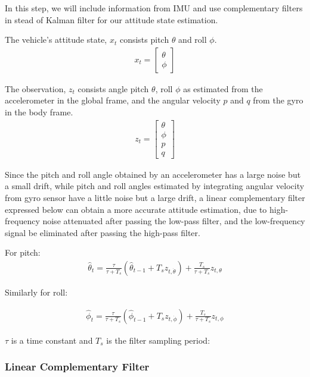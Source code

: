 \documentclass[letterpaper]{article}
\begin{document}
In this step, we will include information from IMU and use complementary filters in stead of Kalman filter for our attitude state estimation.

The vehicle's attitude state, $x_t$ consists pitch $\theta$ and roll $\phi$.
\begin{align*}
  x_t = \left[ \begin{array}{c}\theta\\\phi \end{array} \right]
\end{align*}

The observation, $z_t$ consists angle pitch $\theta$, roll $\phi$ as estimated from the accelerometer in the global frame, and the angular velocity $p$ and $q$ from the gyro in the body frame.
\begin{align*}
  z_t = \left[ \begin{array}{c}\theta\\\phi\\p\\q \end{array} \right]
\end{align*}

Since the pitch and roll angle obtained by an accelerometer has a large noise but a small drift, while pitch and roll angles estimated by integrating angular velocity from gyro sensor have a little noise but a large drift, a linear complementary filter expressed below can obtain a more accurate attitude estimation, due to high-frequency noise attenuated after passing the low-pass filter, and the low-frequency signal be eliminated after passing the high-pass filter.

For pitch: 
\begin{align*}
  \hat{\theta}_t = \frac{\tau}{\tau + T_s} \left( \hat{\theta}_{t-1} + T_s z_{t,\dot{\theta}} \right) + \frac{T_s}{\tau + T_s} z_{t,\theta}
\end{align*}

Similarly for roll: 

\begin{align*}
  \hat{\phi}_t = \frac{\tau}{\tau + T_s} \left( \hat{\phi}_{t-1} + T_s z_{t,\dot{\phi}} \right) + \frac{T_s}{\tau + T_s} z_{t,\phi}
\end{align*}

$\tau$ is a time constant and $T_s$ is the filter sampling period:


\subsubsection{Linear Complementary Filter}
\end{document}
